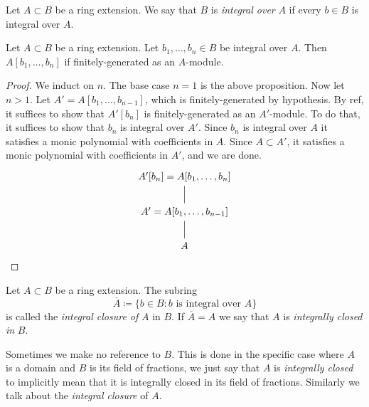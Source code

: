 \documentclass[12pt]{article}
\begin{document}
\begin{definition}
	Let $A\subset B$ be a ring extension. We say that $B$ is \emph{integral over} $A$ if every $b\in B$ is integral over $A$.
\end{definition}

\begin{corollary}
	Let $A\subset B$ be a ring extension. Let $b_1,\dots,b_n\in B$ be integral over $A$. Then $A[b_1,\dots,b_n]$ if finitely-generated as an $A$-module.
\end{corollary}
\begin{proof}
	We induct on $n$. The base case $n=1$ is the above proposition. Now let $n>1$. Let $A'=A[b_1,\dots,b_{n-1}]$, which is finitely-generated by hypothesis. By ref, it suffices to show that $A'[b_n]$ is finitely-generated as an $A'$-module. To do that, it suffices to show that $b_n$ is integral over $A'$. Since $b_n$ is integral over $A$ it satisfies a monic polynomial with coefficients in $A$. Since $A\subset A'$, it satisfies a monic polynomial with coefficients in $A'$, and we are done.
	\begin{equation*}
\begin{tikzcd}
{A'[b_n]=A[b_1,\dots,b_n]}                   \\
{A'=A[b_1,\dots,b_{n-1}]} \arrow[u, no head] \\
A \arrow[u, no head]                        
\end{tikzcd}
	\end{equation*}
\end{proof}

\begin{definition}
	Let $A\subset B$ be a ring extension. The subring 
	\begin{equation*}
		\overline{A} \coloneqq \{b\in B: b\text{ is integral over }A\}
	\end{equation*}
	is called the \emph{integral closure of} $A$ in $B$. If $\overline{A}=A$ we say that $A$ is \emph{integrally closed in} $B$.

	Sometimes we make no reference to $B$. This is done in the specific case where $A$ is a domain and $B$ is its field of fractions, we just say that $A$ is \emph{integrally closed} to implicitly mean that it is integrally closed in its field of fractions. Similarly we talk about the \emph{integral closure} of $A$.
\end{definition}
\end{document}
